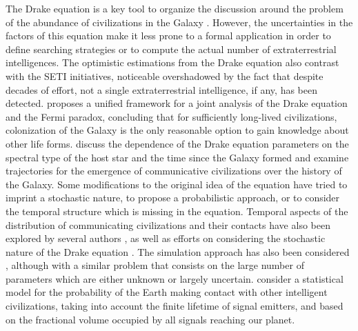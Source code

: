 \documentclass[crop]{CSLB}
\begin{document}
%
The Drake equation is a key tool to organize the discussion around the
problem of the abundance of civilizations in the Galaxy
\citep{hinkel_interdisciplinary_2019}.
%
However, the uncertainties in the factors of this equation make it
less prone to a formal application in order to define searching
strategies or to compute the actual number of extraterrestrial
intelligences.
%
The optimistic estimations from the Drake equation also contrast with
the SETI initiatives, noticeable overshadowed by the fact that despite
decades of effort, not a single extraterrestrial intelligence, if any,
has been detected.
%
\citet{prantzos_joint_2013} proposes a unified framework for a joint
analysis of the Drake equation and the Fermi paradox, concluding that
for sufficiently long-lived civilizations, colonization of the Galaxy
is the only reasonable option to gain knowledge about other life
forms.
%
\citet{haqq-misra_drake_2017} discuss the dependence of the Drake
equation parameters on the spectral type of the host star and the time
since the Galaxy formed and examine trajectories for the emergence of
communicative civilizations over the history of the Galaxy.
%
Some modifications to the original idea of the equation have tried to
imprint a stochastic nature, to propose a probabilistic approach, or
to consider the temporal structure which is missing in the equation.
%
Temporal aspects of the distribution of communicating civilizations
and their contacts have also been explored by several authors
\citep{fogg_temporal_1987, forgan_spatiotemporal_2011,
balbi_impact_2018, balb_spatiotemporal_2018, horvat_impact_2011}, as
well as efforts on considering the stochastic nature of the Drake
equation \citep{glade_stochastic_2011}.
%
The simulation approach has also been considered
\citep{forgan_evaluating_2015, vukotic_grandeur_2016,
murante_simulating_2015, forgan_numerical_2009, forgan_galactic_2017,
ramirez_new_2017}, although with a similar problem that consists on
the large number of parameters which are either unknown or largely
uncertain.
%
\citet{grimaldi_signal_2017} consider a statistical model for the
probability of the Earth making contact with other intelligent
civilizations, taking into account the finite lifetime of signal
emitters, and based on the fractional volume occupied by all signals
reaching our planet.
\end{document}
